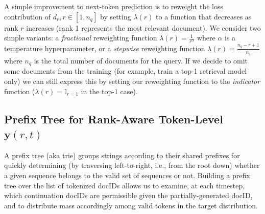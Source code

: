 \documentclass[11pt, a4paper, onecolumn, confidential, copyright, gdm]{google}
\begin{document}
A simple improvement to next-token prediction is to reweight the loss contribution of $d_r, r \in [1, n_q]$ by setting $\lambda(r)$ to a function that decreases as rank $r$ increases (rank 1 represents the most relevant document). We consider two simple variants: a \textit{fractional} reweighting function $\lambda(r) = \frac{1}{r^\alpha}$ where $\alpha$ is a temperature hyperparameter, or a \textit{stepwise} reweighting function $\lambda(r) = \frac{n_q - r + 1}{n_q}$ where $n_q$ is the total number of documents for the query. If we decide to omit some documents from the training (for example, train a top-1 retrieval model only) we can still express this by setting our reweighting function to the \textit{indicator} function ($\lambda(r) = \mathbb{I}_{r=1}$ in the top-1 case).


\subsection{Prefix Tree for Rank-Aware Token-Level $\mathbf{y}(r,t)$}\label{sec:prefix-tree}

A prefix tree (aka trie) groups strings according to their shared prefixes for quickly determining (by traversing left-to-right, i.e., from the root down) whether a given sequence belongs to the valid set of sequences or not. Building a prefix tree over the list of tokenized docIDs allows us to examine, at each timestep, which continuation docIDs are permissible given the partially-generated docID, and to distribute mass accordingly among valid tokens in the target distribution.
\end{document}
